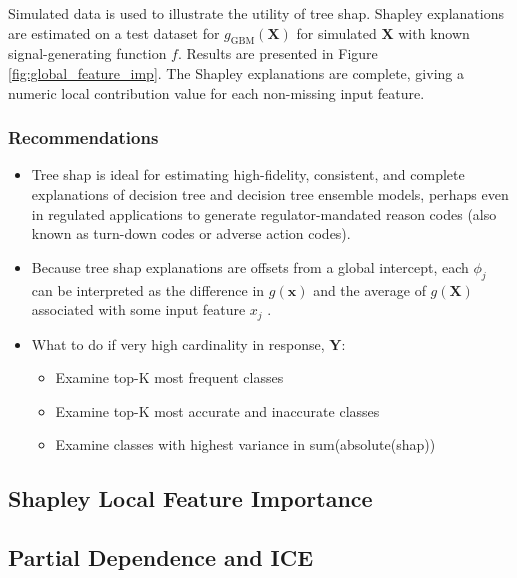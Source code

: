 \documentclass{article}
\begin{document}
Simulated data is used to illustrate the utility of tree shap. Shapley explanations are estimated on a test dataset for $g_{\text{GBM}}(\mathbf{X})$ for simulated $\mathbf{X}$ with known signal-generating function $f$. Results are presented in Figure \ref{fig:global_feature_imp}. The Shapley explanations are complete, giving a numeric local contribution value for each non-missing input feature.

\subsubsection{Recommendations}

\begin{itemize}
	
	\item Tree shap is ideal for estimating high-fidelity, consistent, and complete explanations of decision tree and decision tree ensemble models, perhaps even in regulated applications to generate regulator-mandated reason codes (also known as turn-down codes or adverse action codes).
	
	\item Because tree shap explanations are offsets from a global intercept, each $\phi_j$ can be interpreted as the difference in $g(\mathbf{x})$ and the average of $g(\mathbf{X})$ associated with some input feature $x_j$ \cite{molnar}. 

\item What to do if very high cardinality in response, $\mathbf{Y}$:

\begin{itemize}

  \item Examine top-K most frequent classes
  \item Examine top-K most accurate and inaccurate classes
  \item Examine classes with highest variance in sum(absolute(shap))

\end{itemize}

\end{itemize}

\subsection{Shapley Local Feature Importance}

\subsection{Partial Dependence and ICE}
\end{document}
